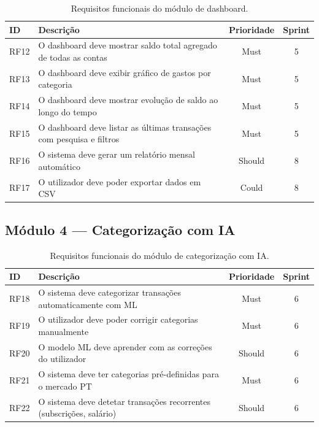 \begin{table}[H]
\centering
\caption{Requisitos funcionais do módulo de dashboard.}
\label{tab:rf-dashboard}
\small
\begin{tabularx}{\textwidth}{l X c c}
\toprule
\textbf{ID} & \textbf{Descrição} & \textbf{Prioridade} & \textbf{Sprint} \\
\midrule
RF12 & O dashboard deve mostrar saldo total agregado de todas as contas & Must & 5 \\
RF13 & O dashboard deve exibir gráfico de gastos por categoria & Must & 5 \\
RF14 & O dashboard deve mostrar evolução de saldo ao longo do tempo & Must & 5 \\
RF15 & O dashboard deve listar as últimas transações com pesquisa e filtros & Must & 5 \\
RF16 & O sistema deve gerar um relatório mensal automático & Should & 8 \\
RF17 & O utilizador deve poder exportar dados em CSV & Could & 8 \\
\bottomrule
\end{tabularx}
\end{table}

\subsection{Módulo 4 --- Categorização com IA}

\begin{table}[H]
\centering
\caption{Requisitos funcionais do módulo de categorização com IA.}
\label{tab:rf-ia}
\small
\begin{tabularx}{\textwidth}{l X c c}
\toprule
\textbf{ID} & \textbf{Descrição} & \textbf{Prioridade} & \textbf{Sprint} \\
\midrule
RF18 & O sistema deve categorizar transações automaticamente com \ac{ML} & Must & 6 \\
RF19 & O utilizador deve poder corrigir categorias manualmente & Must & 6 \\
RF20 & O modelo \ac{ML} deve aprender com as correções do utilizador & Should & 6 \\
RF21 & O sistema deve ter categorias pré-definidas para o mercado PT & Must & 6 \\
RF22 & O sistema deve detetar transações recorrentes (subscrições, salário) & Should & 6 \\
\bottomrule
\end{tabularx}
\end{table}

